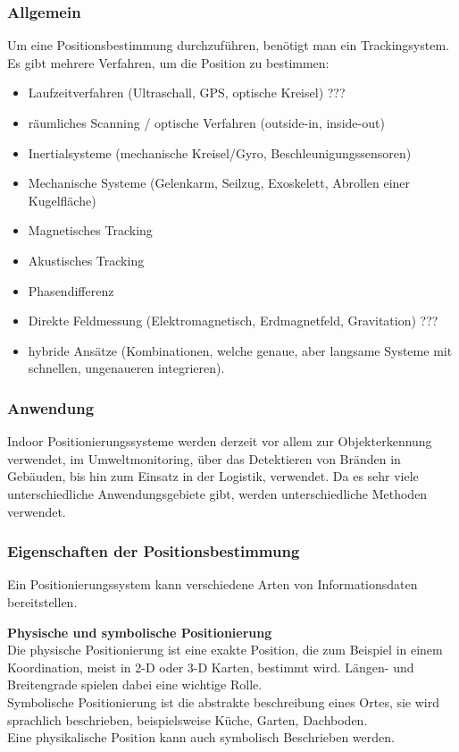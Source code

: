     \subsubsection{Allgemein}
    Um eine Positionsbestimmung durchzuführen, benötigt man ein Trackingsystem. 
    Es gibt mehrere Verfahren, um die Position zu bestimmen: \cite{PositionAllg}
    \begin{itemize}
    \item Laufzeitverfahren (Ultraschall, GPS, optische Kreisel) ???
    \item räumliches Scanning / optische Verfahren (outside-in, inside-out)
    \item Inertialsysteme (mechanische Kreisel/Gyro, Beschleunigungssensoren)
    \item Mechanische Systeme (Gelenkarm, Seilzug, Exoskelett, Abrollen einer Kugelfläche)
    \item Magnetisches Tracking
    \item Akustisches Tracking
    \item Phasendifferenz
    \item Direkte Feldmessung (Elektromagnetisch, Erdmagnetfeld, Gravitation) ???
    \item hybride Ansätze (Kombinationen, welche genaue, aber langsame Systeme mit schnellen, ungenaueren integrieren).
    \end{itemize}   

    \subsubsection{Anwendung} 
    Indoor Positionierungssysteme werden derzeit vor allem zur Objekterkennung verwendet, im Umweltmonitoring, über das Detektieren von Bränden in Gebäuden, bis hin zum Einsatz in der Logistik, verwendet. Da es sehr viele unterschiedliche Anwendungsgebiete gibt, werden unterschiedliche Methoden verwendet. \cite{posAnwendung}

    \subsubsection{Eigenschaften der Positionsbestimmung}

    Ein Positionierungssystem kann verschiedene Arten von Informationsdaten bereitstellen. \cite{pos_eigenschaften}

    \textbf{Physische und symbolische Positionierung}\\
    Die physische Positionierung ist eine exakte Position, die zum Beispiel in einem Koordination, meist in 2-D oder 3-D Karten, bestimmt wird. Längen- und Breitengrade spielen dabei eine wichtige Rolle.\\
    Symbolische Positionierung ist die abstrakte beschreibung eines Ortes, sie wird sprachlich beschrieben, beispielsweise Küche, Garten, Dachboden.\\
    Eine physikalische Position kann auch symbolisch Beschrieben werden.
    
